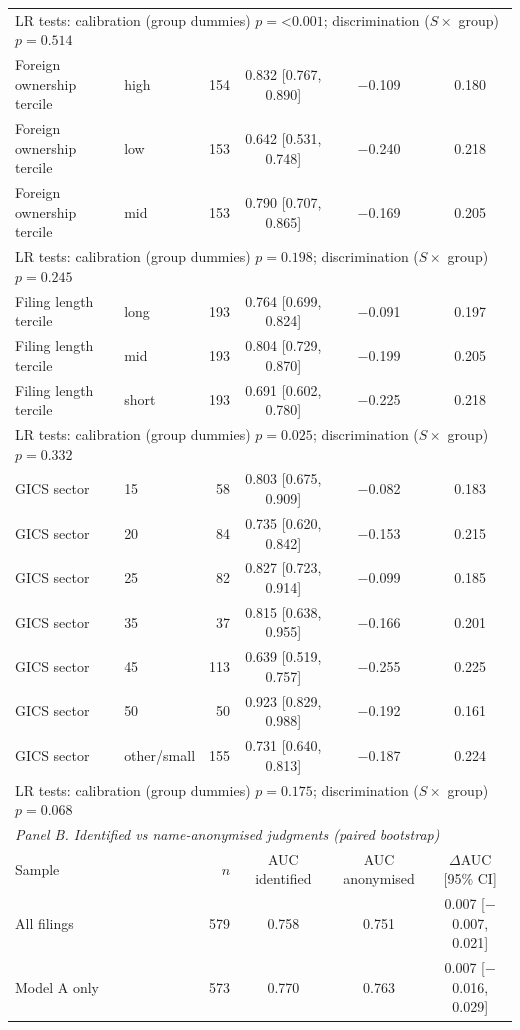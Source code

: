 \begin{tabular}{llrccc}
\multicolumn{6}{l}{\quad LR tests: calibration (group dummies) $p = $<$0.001$; discrimination ($S \times$ group) $p = 0.514$} \\
Foreign ownership tercile & high & 154 & 0.832 [0.767, 0.890] & $-$0.109 & 0.180 \\
Foreign ownership tercile & low & 153 & 0.642 [0.531, 0.748] & $-$0.240 & 0.218 \\
Foreign ownership tercile & mid & 153 & 0.790 [0.707, 0.865] & $-$0.169 & 0.205 \\
\multicolumn{6}{l}{\quad LR tests: calibration (group dummies) $p = 0.198$; discrimination ($S \times$ group) $p = 0.245$} \\
Filing length tercile & long & 193 & 0.764 [0.699, 0.824] & $-$0.091 & 0.197 \\
Filing length tercile & mid & 193 & 0.804 [0.729, 0.870] & $-$0.199 & 0.205 \\
Filing length tercile & short & 193 & 0.691 [0.602, 0.780] & $-$0.225 & 0.218 \\
\multicolumn{6}{l}{\quad LR tests: calibration (group dummies) $p = 0.025$; discrimination ($S \times$ group) $p = 0.332$} \\
GICS sector & 15 & 58 & 0.803 [0.675, 0.909] & $-$0.082 & 0.183 \\
GICS sector & 20 & 84 & 0.735 [0.620, 0.842] & $-$0.153 & 0.215 \\
GICS sector & 25 & 82 & 0.827 [0.723, 0.914] & $-$0.099 & 0.185 \\
GICS sector & 35 & 37 & 0.815 [0.638, 0.955] & $-$0.166 & 0.201 \\
GICS sector & 45 & 113 & 0.639 [0.519, 0.757] & $-$0.255 & 0.225 \\
GICS sector & 50 & 50 & 0.923 [0.829, 0.988] & $-$0.192 & 0.161 \\
GICS sector & other/small & 155 & 0.731 [0.640, 0.813] & $-$0.187 & 0.224 \\
\multicolumn{6}{l}{\quad LR tests: calibration (group dummies) $p = 0.175$; discrimination ($S \times$ group) $p = 0.068$} \\
\midrule
\multicolumn{6}{l}{\emph{Panel B. Identified vs name-anonymised judgments (paired bootstrap)}} \\
Sample & & $n$ & AUC identified & AUC anonymised & $\Delta$AUC [95\% CI] \\
\midrule
All filings & & 579 & 0.758 & 0.751 & 0.007 [$-$0.007, 0.021] \\
Model A only & & 573 & 0.770 & 0.763 & 0.007 [$-$0.016, 0.029] \\

\end{tabular}
